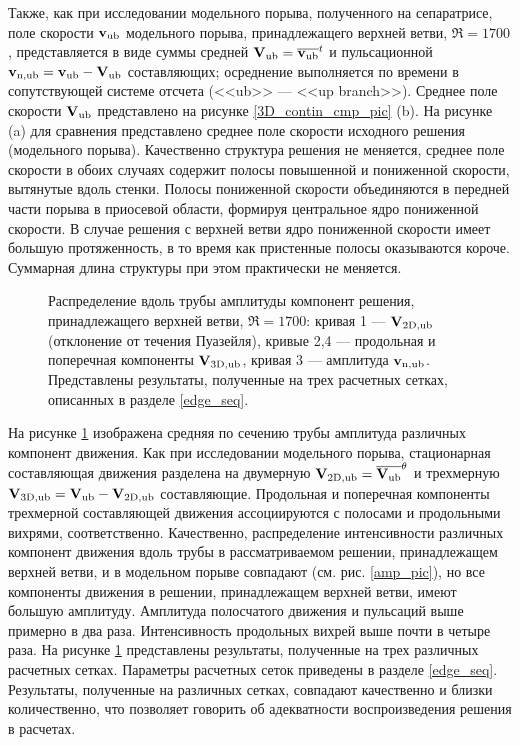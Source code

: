 Также, как при исследовании модельного порыва, полученного на сепаратрисе, поле скорости $\mathbf{v}_\mathrm{ub}$ модельного порыва, принадлежащего верхней ветви, $\Re = 1700$, представляется в виде суммы средней $\mathbf{V}_\mathrm{ub} = \overline{\mathbf{v}_\mathrm{ub}}^t$ и пульсационной $\mathbf{v}_\mathrm{n,ub} = \mathbf{v}_\mathrm{ub} - \mathbf{V}_\mathrm{ub}$ составляющих; осреднение выполняется по времени в сопутствующей системе отсчета (<<ub>> --- <<up branch>>). Среднее поле скорости $\mathbf{V}_\mathrm{ub}$ представлено на рисунке \ref{3D_contin_cmp_pic} (b). На рисунке (a) для сравнения представлено среднее поле скорости исходного решения (модельного порыва). Качественно структура решения не меняется, среднее поле скорости в обоих случаях содержит полосы повышенной и пониженной скорости, вытянутые вдоль стенки. Полосы пониженной скорости объединяются в передней части порыва в приосевой области, формируя центральное ядро пониженной скорости. В случае решения с верхней ветви ядро пониженной скорости имеет большую протяженность, в то время как пристенные полосы оказываются короче. Суммарная длина структуры при этом практически не меняется. 


\begin{figure}
\caption{Распределение вдоль трубы амплитуды компонент решения, принадлежащего верхней ветви, $\Re = 1700$: кривая 1 --- $\mathbf{V}_\mathrm{2D,ub}$ (отклонение от течения Пуазейля), кривые 2,4 --- продольная и поперечная компоненты $\mathbf{V}_\mathrm{3D,ub}$, кривая 3 --- амплитуда $\mathbf{v}_\mathrm{n,ub}$. Представлены результаты, полученные на трех расчетных сетках, описанных в разделе \ref{edge_seq}.}
\label{amp_ub_pic}
\end{figure}


На рисунке \ref{amp_ub_pic} изображена средняя по сечению трубы амплитуда различных компонент движения. Как при исследовании модельного порыва, стационарная составляющая движения разделена на двумерную $\mathbf{V}_\mathrm{2D,ub} = \overline{\mathbf{V}_\mathrm{ub}}^{\theta}$ и трехмерную $\mathbf{V}_\mathrm{3D,ub} = \mathbf{V}_\mathrm{ub} - \mathbf{V}_\mathrm{2D,ub}$ составляющие. Продольная и поперечная компоненты трехмерной составляющей движения ассоциируются с полосами и продольными вихрями, соответственно. Качественно, распределение интенсивности различных компонент движения вдоль трубы в рассматриваемом решении, принадлежащем верхней ветви, и в модельном порыве совпадают (см. рис. \ref{amp_pic}), но все компоненты движения в решении, принадлежащем верхней ветви, имеют большую амплитуду. Амплитуда полосчатого движения и пульсаций выше примерно в два раза. Интенсивность продольных вихрей выше почти в четыре раза. На рисунке \ref{amp_ub_pic} представлены результаты, полученные на трех различных расчетных сетках. Параметры расчетных сеток приведены в разделе \ref{edge_seq}. Результаты, полученные на различных сетках, совпадают качественно и близки количественно, что позволяет говорить об адекватности воспроизведения решения в расчетах. 


